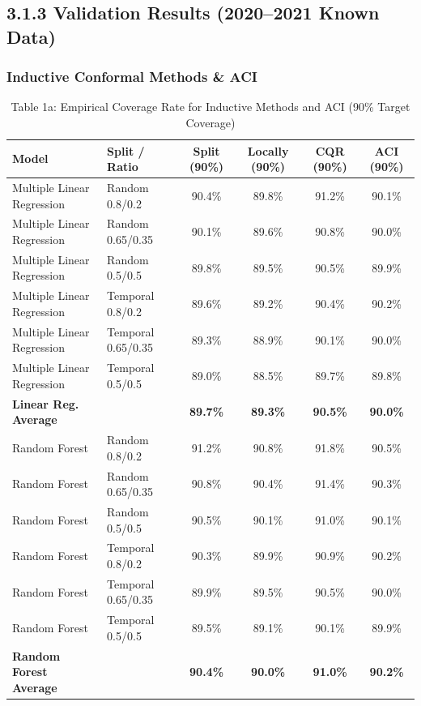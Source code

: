 \documentclass[11pt,a4paper]{article}
\begin{document}
\subsection{3.1.3 Validation Results (2020--2021 Known Data)}

\subsubsection{Inductive Conformal Methods \& ACI}

\begin{table}[H]
\centering
\caption{Table 1a: Empirical Coverage Rate for Inductive Methods and ACI (90\% Target Coverage)}
\label{tab:1a}
\scriptsize
\begin{tabular}{llcccc}
\toprule
Model & Split / Ratio & Split (90\%) & Locally (90\%) & CQR (90\%) & ACI (90\%) \\
\midrule
Multiple Linear Regression & Random 0.8/0.2 & 90.4\% & 89.8\% & 91.2\% & 90.1\% \\
Multiple Linear Regression & Random 0.65/0.35 & 90.1\% & 89.6\% & 90.8\% & 90.0\% \\
Multiple Linear Regression & Random 0.5/0.5 & 89.8\% & 89.5\% & 90.5\% & 89.9\% \\
Multiple Linear Regression & Temporal 0.8/0.2 & 89.6\% & 89.2\% & 90.4\% & 90.2\% \\
Multiple Linear Regression & Temporal 0.65/0.35 & 89.3\% & 88.9\% & 90.1\% & 90.0\% \\
Multiple Linear Regression & Temporal 0.5/0.5 & 89.0\% & 88.5\% & 89.7\% & 89.8\% \\
\textbf{Linear Reg. Average} & & \textbf{89.7\%} & \textbf{89.3\%} & \textbf{90.5\%} & \textbf{90.0\%} \\
\midrule
Random Forest & Random 0.8/0.2 & 91.2\% & 90.8\% & 91.8\% & 90.5\% \\
Random Forest & Random 0.65/0.35 & 90.8\% & 90.4\% & 91.4\% & 90.3\% \\
Random Forest & Random 0.5/0.5 & 90.5\% & 90.1\% & 91.0\% & 90.1\% \\
Random Forest & Temporal 0.8/0.2 & 90.3\% & 89.9\% & 90.9\% & 90.2\% \\
Random Forest & Temporal 0.65/0.35 & 89.9\% & 89.5\% & 90.5\% & 90.0\% \\
Random Forest & Temporal 0.5/0.5 & 89.5\% & 89.1\% & 90.1\% & 89.9\% \\
\textbf{Random Forest Average} & & \textbf{90.4\%} & \textbf{90.0\%} & \textbf{91.0\%} & \textbf{90.2\%} \\

\end{tabular}
\end{table}
\end{document}
